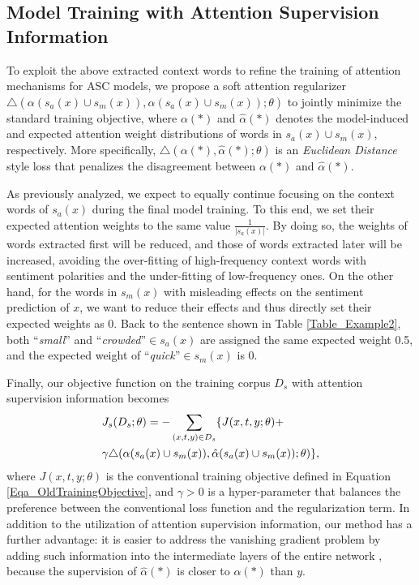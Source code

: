 \documentclass[11pt,a4paper]{article}
\begin{document}
\subsection{Model Training with Attention Supervision Information} \label{SubSection_ModelTraining}

To exploit the above extracted context words to refine the training of attention mechanisms for ASC models,
we propose a soft attention regularizer $\triangle(\alpha(s_a(x)\cup s_m(x)), \hat{\alpha}(s_a(x)\cup s_m(x)); \theta)$ to jointly minimize the standard training objective,
where $\alpha(*)$ and $\hat{\alpha}(*)$ denotes the model-induced and expected attention weight distributions of words in $s_a(x)\cup s_m(x)$, respectively.
More specifically,
$\triangle(\alpha(*),\hat{\alpha}(*);\theta)$ is an \emph{Euclidean Distance} style loss that penalizes the disagreement between $\alpha(*)$ and $\hat{\alpha}(*)$.

As previously analyzed,
we expect to equally continue focusing on the context words of $s_a(x)$ during the final model training.
To this end,
we set their expected attention weights to the same value $\frac{1}{|s_a(x)|}$.
By doing so,
the weights of words extracted first will be reduced, and those of words extracted later will be increased,
avoiding the over-fitting of high-frequency context words with sentiment polarities and the under-fitting of low-frequency ones.
On the other hand,
for the words in $s_m(x)$ with misleading effects on the sentiment prediction of $x$,
we want to reduce their effects and thus directly set their expected weights as 0.
Back to the sentence shown in Table \ref{Table_Example2},
both ``\emph{small}'' and ``\emph{crowded}''$\in$$s_a(x)$ are assigned the same expected weight 0.5,
and the expected weight of ``\emph{quick}''$\in$$s_m(x)$ is 0.

Finally,
our objective function on the training corpus $D_s$ with attention supervision information becomes
\begin{align}\label{Eqa_NewTrainingObjective}
&J_s(D_s;\theta) = -\sum_{(x,t,y)\in D_s} \{J(x,t,y;\theta)+ \\
&\gamma\triangle(\alpha(s_a(x)\cup s_m(x)),\hat{\alpha}(s_a(x)\cup s_m(x));\theta)\}, \notag
\end{align}where $J(x,t,y;\theta)$ is the conventional training objective defined in Equation \ref{Eqa_OldTrainingObjective},
and $\gamma$$>$$0$ is a hyper-parameter that balances the preference between the conventional loss function and the regularization term.
In addition to the utilization of attention supervision information,
our method has a further advantage:
it is easier to address the vanishing gradient problem
by adding such information into the intermediate layers of the entire network \cite{Szegedy:CVPR2015}, 
because the supervision of $\hat{\alpha}(*)$ is closer to $\alpha(*)$ than $y$.
\end{document}
